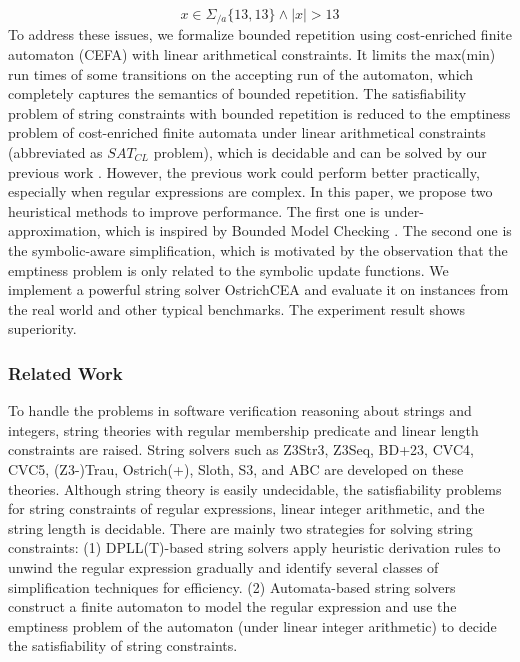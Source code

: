 {\begin{equation}\label{eq:BD+23_timeout}
  x\in \Sigma_{/a}\{13,13\}\wedge |x| > 13
\end{equation}
To address these issues, we formalize bounded repetition using cost-enriched finite automaton (CEFA)\cite{atva2020} with linear arithmetical constraints. It limits the max(min) run times of some transitions on the accepting run of the automaton, which completely captures the semantics of bounded repetition. The satisfiability problem of string constraints with bounded repetition is reduced to the emptiness problem of cost-enriched finite automata under linear arithmetical constraints (abbreviated as $SAT_{CL}$ problem), which is decidable and can be solved by our previous work \cite{atva2020}. However, the previous work could perform better practically, especially when regular expressions are complex. In this paper, we propose two heuristical methods to improve performance. The first one is under-approximation, which is inspired by Bounded Model Checking \cite{bmc_1}\cite{bmc_2}\cite{bmc_3}. The second one is the symbolic-aware simplification, which is motivated by the observation that the emptiness problem is only related to the symbolic update functions. We implement a powerful string solver OstrichCEA and evaluate it on instances from the real world and other typical benchmarks. The experiment result shows superiority.

\subsubsection{Related Work}
To handle the problems in software verification reasoning about strings and integers, string theories with regular membership predicate and linear length constraints are raised. String solvers such as Z3Str3\cite{z3str3}, Z3Seq\cite{z3seq}, BD+23\cite{BD+23}, CVC4\cite{cvc4}, CVC5\cite{cvc5}, (Z3-)Trau\cite{trau}\cite{z3trau}, Ostrich(+)\cite{ostrich}\cite{atva2020}, Sloth\cite{sloth}, S3\cite{s3}, and ABC\cite{abc} are developed on these theories. Although string theory is easily
undecidable\cite{undecidable_1}\cite{undecidable_2}, the satisfiability problems for string constraints of regular expressions, linear integer arithmetic, and the string length is decidable\cite{theory_BD+23}. There are mainly two strategies for solving string constraints: (1) DPLL(T)-based\cite{dpll_t} string solvers\cite{z3str3}\cite{cvc5} apply heuristic derivation rules to unwind the regular expression gradually and identify several classes of simplification techniques for efficiency. (2) Automata-based string solvers\cite{trau}\cite{z3trau}\cite{ostrich}\cite{atva2020}\cite{BD+23} construct a finite automaton to model the regular expression and use the emptiness problem of the automaton (under linear integer arithmetic) to decide the satisfiability of string constraints. 


}
